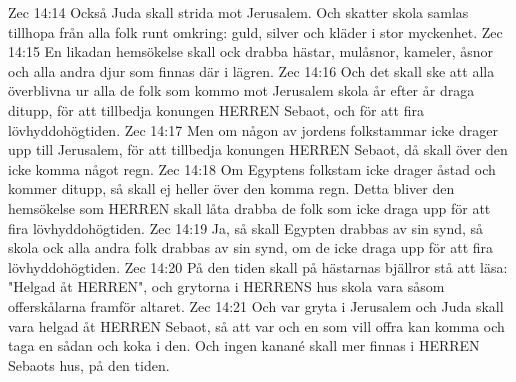 Zec 14:14  Också Juda skall strida mot Jerusalem. Och skatter skola samlas tillhopa från alla folk runt omkring: guld, silver och kläder i stor myckenhet.
Zec 14:15  En likadan hemsökelse skall ock drabba hästar, mulåsnor, kameler, åsnor och alla andra djur som finnas där i lägren.
Zec 14:16  Och det skall ske att alla överblivna ur alla de folk som kommo mot Jerusalem skola år efter år draga ditupp, för att tillbedja konungen HERREN Sebaot, och för att fira lövhyddohögtiden.
Zec 14:17  Men om någon av jordens folkstammar icke drager upp till Jerusalem, för att tillbedja konungen HERREN Sebaot, då skall över den icke komma något regn.
Zec 14:18  Om Egyptens folkstam icke drager åstad och kommer ditupp, så skall ej heller över den komma regn. Detta bliver den hemsökelse som HERREN skall låta drabba de folk som icke draga upp för att fira lövhyddohögtiden.
Zec 14:19  Ja, så skall Egypten drabbas av sin synd, så skola ock alla andra folk drabbas av sin synd, om de icke draga upp för att fira lövhyddohögtiden.
Zec 14:20  På den tiden skall på hästarnas bjällror stå att läsa: "Helgad åt HERREN", och grytorna i HERRENS hus skola vara såsom offerskålarna framför altaret.
Zec 14:21  Och var gryta i Jerusalem och Juda skall vara helgad åt HERREN Sebaot, så att var och en som vill offra kan komma och taga en sådan och koka i den. Och ingen kanané skall mer finnas i HERREN Sebaots hus, på den tiden.


